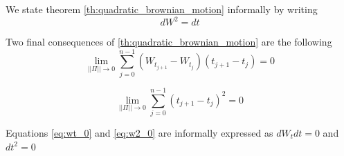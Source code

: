 \documentclass[../TGMAFFIRO]{subfiles}
\begin{document}
We state theorem \ref{th:quadratic_brownian_motion} informally by writing
\begin{equation}
	dW^2 = dt
\end{equation}

Two final consequences of \ref{th:quadratic_brownian_motion} are the following
\begin{equation}\label{eq:wt_0}
	\lim_{||\Pi||\to 0} \sum_{j=0}^{n-1}(W_{t_{j+1}} - W_{t_{j}})(t_{j+1} - t_{j}) = 0
\end{equation}

\begin{equation}\label{eq:w2_0}
	\lim_{||\Pi||\to 0} \sum_{j=0}^{n-1}(t_{j+1} - t_{j})^2 = 0
\end{equation}

Equations \ref{eq:wt_0} and \ref{eq:w2_0} are informally expressed as $dW_tdt = 0$ and $dt^2 = 0$
\end{document}
